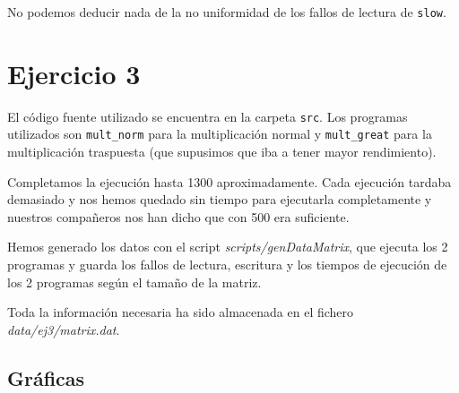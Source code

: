 \documentclass[nochap]{apuntes}
\begin{document}
No podemos deducir nada de la no uniformidad de los fallos de lectura de \texttt{slow}.

\section*{Ejercicio 3}

El código fuente utilizado se encuentra en la carpeta \texttt{src}. Los programas utilizados son \texttt{mult\_norm} para la multiplicación normal y \texttt{mult\_great} para la multiplicación traspuesta (que supusimos que iba a tener mayor rendimiento).

Completamos la ejecución hasta 1300 aproximadamente. Cada ejecución tardaba demasiado y nos hemos quedado sin tiempo para ejecutarla completamente y nuestros compañeros nos han dicho que con 500 era suficiente.

Hemos generado los datos con el script \emph{scripts/genDataMatrix}, que ejecuta los 2 programas y guarda los fallos de lectura, escritura y los tiempos de ejecución de los 2 programas según el tamaño de la matriz.

Toda la información necesaria ha sido almacenada en el fichero \emph{data/ej3/matrix.dat}.

\subsection*{Gr\'aficas}
\end{document}
